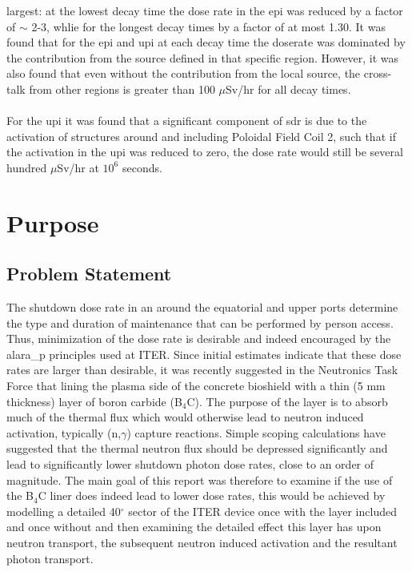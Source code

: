 \documentclass[12pt]{article}
\begin{document}
largest: at the lowest decay time the dose rate in the \gls{epi} was reduced
by a factor of $\sim$ 2-3, whlie for the longest decay times by a factor of at 
most 1.30. It was found that for the \gls{epi} and \gls{upi} at each decay time 
the doserate was dominated by the contribution from the source defined in that
specific region. However, it was also found that even without the contribution from
the local source, the cross-talk from other regions is greater than 100 
$\mu$Sv/hr for all decay times.
\\
\\
For the \gls{upi} it was found that a significant component of \gls{sdr} is due
to the activation of structures around and including  Poloidal Field Coil 2, such 
that if the activation in the \gls{upi} was reduced to zero, the dose rate would
still be several hundred $\mu$Sv/hr at $10^6$ seconds.

\newpage
\clearpage
\section{Purpose}
\subsection{Problem Statement}
The shutdown dose rate in an around the equatorial and upper ports determine the
type and duration of maintenance that can be performed by person access. Thus,
minimization of the dose rate is desirable and indeed encouraged by the 
\gls{alara_p} principles used at ITER. Since initial estimates indicate that
these dose rates are larger than desirable, it was recently suggested in the 
Neutronics Task Force that lining the plasma side of the concrete bioshield 
with a thin (5 mm thickness) layer of boron carbide (B$_4$C). The purpose 
of the layer is to absorb much of the thermal flux which would otherwise lead 
to neutron induced activation, typically (n,$\gamma$) capture reactions. Simple 
scoping calculations have suggested that the thermal neutron flux should be 
depressed significantly and lead to significantly lower shutdown photon dose 
rates, close to an order of magnitude. The main goal of this report was 
therefore to examine if the use of the B$_4$C liner does indeed lead to lower 
dose rates, this would be achieved by modelling a detailed 40$^{\circ}$ sector 
of the ITER device once with the layer included and once without and then 
examining the detailed effect this layer has upon neutron transport, the 
subsequent neutron induced activation and the resultant photon transport.
\end{document}

